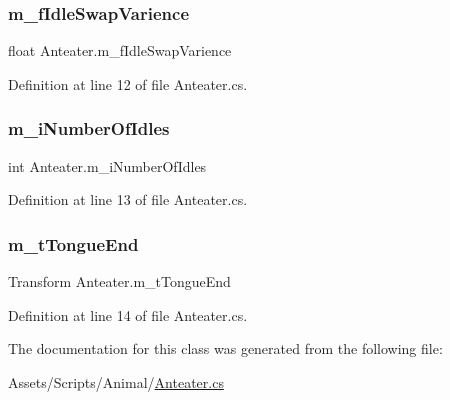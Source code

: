 \subsubsection{\texorpdfstring{m\+\_\+f\+Idle\+Swap\+Varience}{m\_fIdleSwapVarience}}
{\footnotesize\ttfamily float Anteater.\+m\+\_\+f\+Idle\+Swap\+Varience}



Definition at line 12 of file Anteater.\+cs.

\mbox{\label{class_anteater_a1bbf947ef90b8367b0935b7ceea93d69}} 
\subsubsection{\texorpdfstring{m\+\_\+i\+Number\+Of\+Idles}{m\_iNumberOfIdles}}
{\footnotesize\ttfamily int Anteater.\+m\+\_\+i\+Number\+Of\+Idles}



Definition at line 13 of file Anteater.\+cs.

\mbox{\label{class_anteater_a2d6c79cdf7e28a184c8867cabb23b377}} 
\subsubsection{\texorpdfstring{m\+\_\+t\+Tongue\+End}{m\_tTongueEnd}}
{\footnotesize\ttfamily Transform Anteater.\+m\+\_\+t\+Tongue\+End}



Definition at line 14 of file Anteater.\+cs.



The documentation for this class was generated from the following file\+:\begin{DoxyCompactItemize}
\item 
Assets/\+Scripts/\+Animal/\mbox{\hyperlink{_anteater_8cs}{Anteater.\+cs}}\end{DoxyCompactItemize}
